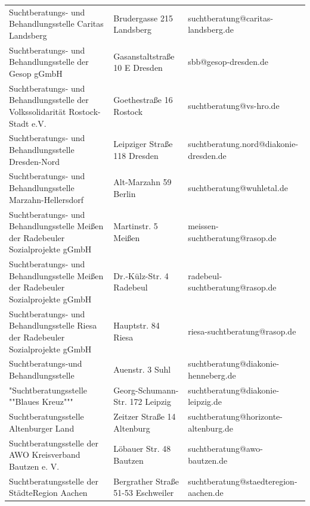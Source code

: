 {\begin{xltabular}{\textwidth} {
 >{\raggedright\arraybackslash}p{5cm}
 >{\raggedright\arraybackslash}X
 >{\raggedright\arraybackslash}p{5cm} }
Suchtberatungs- und Behandlungsstelle Caritas Landsberg & Brudergasse 215 Landsberg & suchtberatung@caritas-landsberg.de \\
Suchtberatungs- und Behandlungsstelle der Gesop gGmbH & Gasanstaltstraße 10 E Dresden & sbb@gesop-dresden.de \\
Suchtberatungs- und Behandlungsstelle der Volkssolidarität Rostock-Stadt e.V. & Goethestraße 16 Rostock & suchtberatung@vs-hro.de \\
Suchtberatungs- und Behandlungsstelle Dresden-Nord & Leipziger Straße 118 Dresden & suchtberatung.nord@diakonie-dresden.de \\
Suchtberatungs- und Behandlungsstelle Marzahn-Hellersdorf & Alt-Marzahn 59 Berlin & suchtberatung@wuhletal.de \\
Suchtberatungs- und Behandlungsstelle Meißen der Radebeuler Sozialprojekte gGmbH & Martinstr. 5 Meißen & meissen-suchtberatung@rasop.de \\
Suchtberatungs- und Behandlungsstelle Meißen der Radebeuler Sozialprojekte gGmbH & Dr.-Külz-Str. 4 Radebeul & radebeul-suchtberatung@rasop.de \\
Suchtberatungs- und Behandlungsstelle Riesa der Radebeuler Sozialprojekte gGmbH & Hauptstr. 84 Riesa & riesa-suchtberatung@rasop.de \\
Suchtberatungs-und Behandlungsstelle & Auenstr. 3 Suhl & suchtberatung@diakonie-henneberg.de \\
"Suchtberatungsstelle ""Blaues Kreuz""" & Georg-Schumann-Str. 172 Leipzig & suchtberatung@diakonie-leipzig.de \\
Suchtberatungsstelle Altenburger Land & Zeitzer Straße 14 Altenburg & suchtberatung@horizonte-altenburg.de \\
Suchtberatungsstelle der AWO Kreisverband Bautzen e. V. & Löbauer Str. 48 Bautzen & suchtberatung@awo-bautzen.de \\
Suchtberatungsstelle der StädteRegion Aachen & Bergrather Straße 51-53 Eschweiler & suchtberatung@staedteregion-aachen.de \\

\end{xltabular}}
